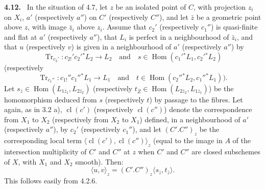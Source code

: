 \documentclass[11pt]{article}
\newenvironment{statement}[1]{\par\medskip\noindent\textbf{#1.}\ }{\par\medskip}
\DeclareMathOperator{\Hom}{Hom}
\providecommand{\cl}{\operatorname{cl}}
\providecommand{\Tr}{\operatorname{Tr}}
\providecommand{\Tr}{\operatorname{Tr}}
\providecommand{\Tr}{\operatorname{Tr}}
\providecommand{\Hom}{\operatorname{Hom}}
\providecommand{\Tr}{\operatorname{Tr}}
\providecommand{\cl}{\operatorname{cl}}
\providecommand{\Hom}{\operatorname{Hom}}
\providecommand{\cl}{\operatorname{cl}}
\providecommand{\Tr}{\operatorname{Tr}}
\begin{document}
\begin{statement}{4.12}
In the situation of 4.7, let $z$ be an isolated point of $C$, with projection $z_i$ on $X_i$, $a'$ (respectively $a''$) on $C'$ (respectively $C''$), and let $\bar z$ be a geometric point above $z$, with image $\bar z_i$ above $z_i$. Assume that $c_2'$ (respectively $c_1''$) is quasi-finite and flat at $a'$ (respectively $a''$), that $L_i$ is perfect in a neighbourhood of $\bar z_i$, and that $u$ (respectively $v$) is given in a neighbourhood of $a'$ (respectively $a''$) by
\[
\Tr_{c_2'}:c_{2!}'c_2'{}^*L_2\longrightarrow L_2
\quad\text{and}\quad
s\in\Hom(c_1'{}^*L_1,c_2'{}^*L_2)
\]
(respectively
\[
\Tr_{c_1''}:c_{1!}''c_1''{}^*L_1\longrightarrow L_1
\quad\text{and}\quad
t\in\Hom(c_2''{}^*L_2,c_1''{}^*L_1)).
\]
Let $s_{\bar z}\in\Hom(L_{1\bar z_1},L_{2\bar z_2})$ (respectively $t_{\bar Z}\in\Hom(L_{2\bar z_2},L_{1\bar z_1})$) be the homomorphism deduced from $s$ (respectively $t$) by passage to the fibres. Let again, as in 3.2 a), $\cl(c')$ (respectively $\cl(c'')$) denote the correspondence from $X_1$ to $X_2$ (respectively from $X_2$ to $X_1$) defined, in a neighbourhood of $a'$ (respectively $a''$), by $c_2'$ (respectively $c_1''$), and let $(C'.C'')_z$ be the corresponding local term $\langle\cl(c'),\cl(c'')\rangle_z$ (equal to the image in $A$ of the intersection multiplicity of $C'$ and $C''$ at $z$ when $C'$ and $C''$ are closed subschemes of $X$, with $X_1$ and $X_2$ smooth). Then:
\begin{equation}
\tag{4.12.1}
\langle u,v\rangle_z=(C'.C'')_z\langle s_{\bar z},t_{\bar z}\rangle.
\end{equation}
This follows easily from 4.2.6.
\end{statement}
\end{document}
